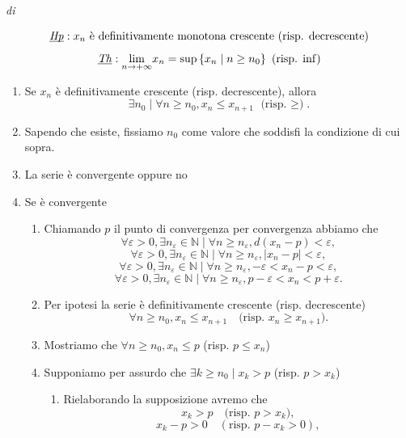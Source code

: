 \begin{demonstration}
    \textit{di} 

    \[
        \underbar{\textit{Hp}}: x_n \text{ è definitivamente monotona crescente (risp. decrescente)}\]\[
        \underbar{\textit{Th}}: \underset{n\rightarrow+\infty}{\lim}x_n=\sup\left\{x_n\mid n \geq n_0\right\} \text{ (risp. $\inf$)}
    \]

    \begin{enumerate}[label=(\roman*)]
        \item Se $x_n$ è definitivamente crescente (risp. decrescente), allora
        \[
            \exists n_0\mid\forall n\geq n_0, x_n \leq x_{n+1} \text{ (risp. $\geq$)}.\]\[
        \]
        \item Sapendo che esiste, fissiamo $n_0$ come valore che soddisfi la condizione di cui sopra.
        \item La serie è convergente oppure no
        \item Se è convergente
        \begin{enumerate}[label=\arabic*.]
            \item Chiamando $p$ il punto di convergenza per convergenza abbiamo che
                \[ \forall \varepsilon>0, \exists n_\varepsilon\in\mathbb{N} \mid \forall n\geq n_\varepsilon, d\left(x_n-p\right) < \varepsilon, \]
                \[ \forall \varepsilon>0, \exists n_\varepsilon\in\mathbb{N} \mid \forall n\geq n_\varepsilon, \left|x_n - p\right| < \varepsilon, \]
                \[ \forall \varepsilon>0, \exists n_\varepsilon\in\mathbb{N} \mid \forall n\geq n_\varepsilon, -\varepsilon<x_n - p< \varepsilon, \]
                \[ \forall \varepsilon>0, \exists n_\varepsilon\in\mathbb{N} \mid \forall n\geq n_\varepsilon, p-\varepsilon <x_n< p+\varepsilon. \]
            \item Per ipotesi la serie è definitivamente crescente (risp. decrescente)
                \[ \forall n \geq n_0, x_n \leq x_{n+1} \quad \text{(risp. $x_n \geq x_{n+1}$)}.\]
            \item Mostriamo che $\forall n \geq n_0, x_n \leq p$ (risp. $p \leq x_n$)
            \item Supponiamo per assurdo che $\exists k \geq n_0 \mid x_k > p$ (risp. $p > x_k$)
            \begin{enumerate}[label=\arabic{enumii}.\arabic*.]
                \item Rielaborando la supposizione avremo che \[
                    x_k > p \quad\text{(risp. $p > x_k$)},\]\[
                    x_k - p > 0 \quad\left(\text{risp. $p - x_k > 0$}\right),\]\[
\]
\end{enumerate}
\end{enumerate}
\end{enumerate}
\end{demonstration}
